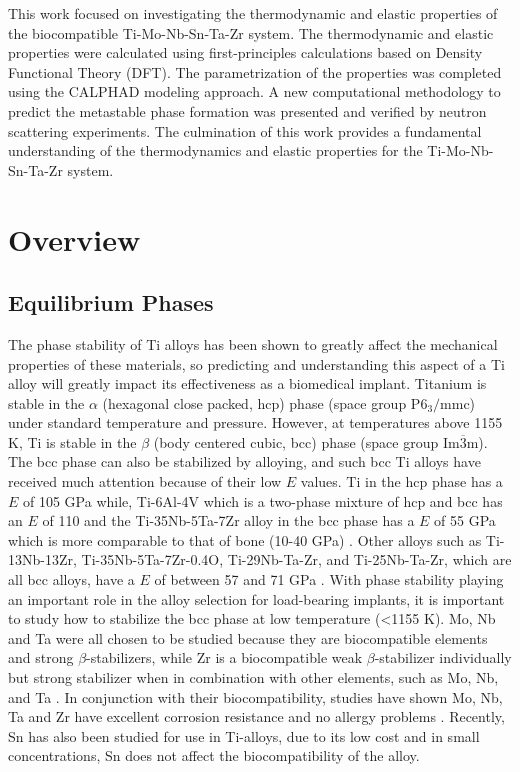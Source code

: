 This work focused on investigating the thermodynamic and elastic properties of the biocompatible Ti-Mo-Nb-Sn-Ta-Zr system. The thermodynamic and elastic properties were calculated using first-principles calculations based on Density Functional Theory (DFT). The parametrization of the properties was completed using the CALPHAD modeling approach. A new computational methodology to predict the metastable phase formation was presented and verified by neutron scattering experiments. The culmination of this work provides a fundamental understanding of the thermodynamics and elastic properties for the Ti-Mo-Nb-Sn-Ta-Zr system.

\section{Overview}

\subsection{Equilibrium Phases}

The phase stability of Ti alloys has been shown to greatly affect the mechanical properties of these materials, so predicting and understanding this aspect of a Ti alloy will greatly impact its effectiveness as a biomedical implant. Titanium is stable in the $\alpha$ (hexagonal close packed, hcp) phase (space group P$6_{3}/$mmc) under standard temperature and pressure. However, at temperatures above 1155 K, Ti is stable in the $\beta$ (body centered cubic, bcc) phase (space group Im$\overline{3}$m). The bcc phase can also be stabilized by alloying, and such bcc Ti alloys have received much attention because of their low $E$ values. Ti in the hcp phase has a $E$ of 105 GPa while, Ti-6Al-4V which is a two-phase mixture of hcp and bcc has an $E$ of 110 and the Ti-35Nb-5Ta-7Zr alloy in the bcc phase has a $E$ of 55 GPa which is more comparable to that of bone (10-40 GPa) \cite{Long1998a,Jain2013,Antolin2012,Mei2011,Brailovski2011b}. Other alloys such as Ti-13Nb-13Zr, Ti-35Nb-5Ta-7Zr-0.4O, Ti-29Nb-Ta-Zr, and Ti-25Nb-Ta-Zr, which are all bcc alloys, have a $E$ of between 57 and 71 GPa \cite{Long1998a,Tane2008a,Tane2010a}. With phase stability playing an important role in the alloy selection for load-bearing implants, it is important to study how to stabilize the bcc phase at low temperature (<1155 K). Mo, Nb and Ta were all chosen to be studied because they are biocompatible elements and strong $\beta$-stabilizers, while Zr is a biocompatible weak $\beta$-stabilizer individually but strong stabilizer when in combination with other elements, such as Mo, Nb, and Ta \cite{Long1998a}. In conjunction with their biocompatibility, studies have shown Mo, Nb, Ta and Zr have excellent corrosion resistance and no allergy problems \cite{Tane2008a}. Recently, Sn has also been studied for use in Ti-alloys, due to its low cost \cite{Niinomi2012} and in small concentrations, Sn does not affect the biocompatibility of the alloy. 

